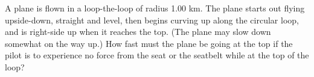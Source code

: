 A plane is flown in a loop-the-loop of radius 1.00 km.
        The plane starts out flying upside-down, straight and level,
        then begins curving up along the circular loop, and is
        right-side up when it reaches the top. (The plane may slow
        down somewhat on the way up.) How fast must the plane be
        going at the top if the pilot is to experience no force from
        the seat or the seatbelt while at the top of the loop? \answercheck
